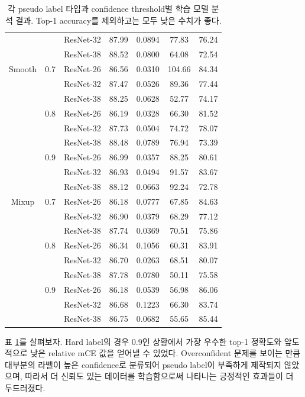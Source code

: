 \documentclass[a4paper, 10pt]{article}
\begin{document}
\begin{table}[!h]
\begin{tabular}{|c|c|c|c|c|c|c|}
     &  & ResNet-32 & 87.99 & 0.0894 & 77.83 & 76.24 \\
     &  & ResNet-38 & 88.52 & 0.0800 & 64.08 & 72.54 \\ \hline
    Smooth & 0.7 & ResNet-26 & 86.56 & 0.0310 & 104.66 & 84.34 \\
     &  & ResNet-32 & 87.47 & 0.0526 & 89.36 & 77.44 \\
     &  & ResNet-38 & 88.25 & 0.0628 & 52.77 & 74.17 \\ \hhline{|~|-|-|-|-|-|-|}
     & 0.8 & ResNet-26 & 86.19 & 0.0328 & 66.30 & 81.52 \\
     &  & ResNet-32 & 87.73 & 0.0504 & 74.72 & 78.07 \\
     &  & ResNet-38 & 88.48 & 0.0789 & 76.94 & 73.39 \\ \hhline{|~|-|-|-|-|-|-|}
     & 0.9 & ResNet-26 & 86.99 & 0.0357 & 88.25 & 80.61 \\
     &  & ResNet-32 & 86.93 & 0.0494 & 91.57 & 83.67 \\
     &  & ResNet-38 & 88.12 & 0.0663 & 92.24 & 72.78 \\ \hline
    Mixup & 0.7 & ResNet-26 & 86.18 & 0.0777 & 67.85 & 84.63 \\
     &  & ResNet-32 & 86.90 & 0.0379 & 68.29 & 77.12 \\
     &  & ResNet-38 & 87.74 & 0.0369 & 70.51 & 75.86 \\ \hhline{|~|-|-|-|-|-|-|}
     & 0.8 & ResNet-26 & 86.34 & 0.1056 & 60.31 & 83.91 \\
     &  & ResNet-32 & 86.70 & 0.0263 & 68.51 & 80.07 \\
     &  & ResNet-38 & 87.78 & 0.0780 & 50.11 & 75.58 \\ \hhline{|~|-|-|-|-|-|-|}
     & 0.9 & ResNet-26 & 86.18 & 0.0539 & 56.98 & 86.06 \\
     &  & ResNet-32 & 86.68 & 0.1223 & 66.30 & 83.74 \\
     &  & ResNet-38 & 86.75 & 0.0682 & 55.65 & 85.44 \\ \hline
  \end{tabular}
  \caption{각 pseudo label 타입과 confidence threshold별 학습 모델 분석 결과. Top-1 accuracy를 제외하고는 모두 낮은 수치가 좋다.}
  \label{ablation_confidence}
\end{table}

표 \ref{ablation_confidence}를 살펴보자. Hard label의 경우 0.9인 상황에서 가장
우수한 top-1 정확도와 앞도적으로 낮은 relative mCE 값을 얻어낼 수 있었다.
Overconfident 문제를 보이는 만큼 대부분의 라벨이 높은 confidence로 분류되어
pseudo label이 부족하게 제작되지 않았으며, 따라서 더 신뢰도 있는 데이터를
학습함으로써 나타나는 긍정적인 효과들이 더 두드러졌다.
\end{document}
